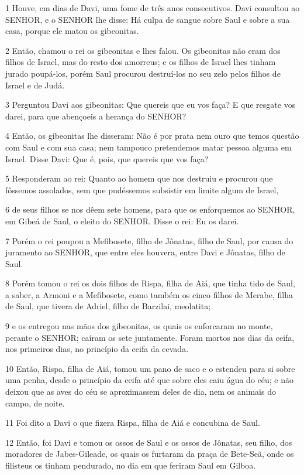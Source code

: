 \par 1 Houve, em dias de Davi, uma fome de três anos consecutivos. Davi consultou ao SENHOR, e o SENHOR lhe disse: Há culpa de sangue sobre Saul e sobre a sua casa, porque ele matou os gibeonitas.
\par 2 Então, chamou o rei os gibeonitas e lhes falou. Os gibeonitas não eram dos filhos de Israel, mas do resto dos amorreus; e os filhos de Israel lhes tinham jurado poupá-los, porém Saul procurou destruí-los no seu zelo pelos filhos de Israel e de Judá.
\par 3 Perguntou Davi aos gibeonitas: Que quereis que eu vos faça? E que resgate vos darei, para que abençoeis a herança do SENHOR?
\par 4 Então, os gibeonitas lhe disseram: Não é por prata nem ouro que temos questão com Saul e com sua casa; nem tampouco pretendemos matar pessoa alguma em Israel. Disse Davi: Que é, pois, que quereis que vos faça?
\par 5 Responderam ao rei: Quanto ao homem que nos destruiu e procurou que fôssemos assolados, sem que pudéssemos subsistir em limite algum de Israel,
\par 6 de seus filhos se nos dêem sete homens, para que os enforquemos ao SENHOR, em Gibeá de Saul, o eleito do SENHOR. Disse o rei: Eu os darei.
\par 7 Porém o rei poupou a Mefibosete, filho de Jônatas, filho de Saul, por causa do juramento ao SENHOR, que entre eles houvera, entre Davi e Jônatas, filho de Saul.
\par 8 Porém tomou o rei os dois filhos de Rispa, filha de Aiá, que tinha tido de Saul, a saber, a Armoni e a Mefibosete, como também os cinco filhos de Merabe, filha de Saul, que tivera de Adriel, filho de Barzilai, meolatita;
\par 9 e os entregou nas mãos dos gibeonitas, os quais os enforcaram no monte, perante o SENHOR; caíram os sete juntamente. Foram mortos nos dias da ceifa, nos primeiros dias, no princípio da ceifa da cevada.
\par 10 Então, Rispa, filha de Aiá, tomou um pano de saco e o estendeu para si sobre uma penha, desde o princípio da ceifa até que sobre eles caiu água do céu; e não deixou que as aves do céu se aproximassem deles de dia, nem os animais do campo, de noite.
\par 11 Foi dito a Davi o que fizera Rispa, filha de Aiá e concubina de Saul.
\par 12 Então, foi Davi e tomou os ossos de Saul e os ossos de Jônatas, seu filho, dos moradores de Jabes-Gileade, os quais os furtaram da praça de Bete-Seã, onde os filisteus os tinham pendurado, no dia em que feriram Saul em Gilboa.

